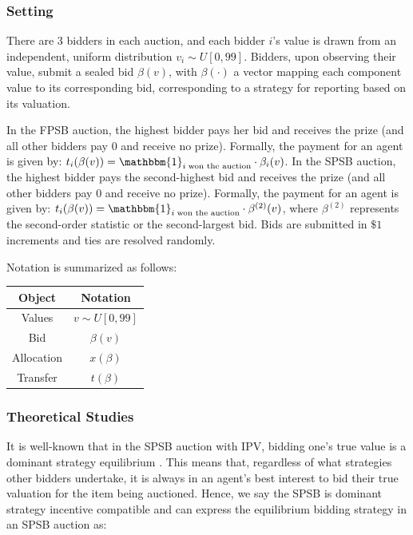 \documentclass{article} %
\begin{document}
\subsubsection{Setting}
There are $3$ bidders in each auction, and each bidder $i$'s value is drawn from an independent, uniform distribution $v_i \sim U[0, 99]$. Bidders, upon observing their value, submit a sealed bid $\beta(v)$, with $\beta(\cdot)$ a vector mapping each component value to its corresponding bid, corresponding to a strategy for reporting based on its valuation. 

In the FPSB auction, the highest bidder pays her bid and receives the prize (and all other bidders pay $0$ and receive no prize). Formally, the payment for an agent is given by: $t_i(\beta(v)) = \mathbbm{1}_{i \; \text{won the auction}}\cdot \beta_i(v)$. 
In the SPSB auction, the highest bidder pays the second-highest bid and receives the prize (and all other bidders pay $0$ and receive no prize). 
Formally, the payment for an agent is given by: $t_i(\beta(v)) = \mathbbm{1}_{i \; \text{won the auction}} \cdot \beta^{(2)}(v)$, where $\beta^{(2)}$ represents the second-order statistic or the second-largest bid. 
Bids are submitted in $\$1$ increments and ties are resolved randomly. 

Notation is summarized as follows:
\begin{table}[h]
    \centering
    \begin{tabular}{|c|c|}
        \hline
        Object & Notation \\
        \hline
        Values & $v \sim U[0,99]$ \\
        \hline
        Bid & $\beta(v)$ \\
        \hline
        Allocation & $x(\beta)$ \\
        \hline
        Transfer & $t(\beta)$ \\
        \hline
    \end{tabular}
    \label{tab:notation}
\end{table}
\subsubsection{Theoretical Studies}

It is well-known that in the SPSB auction with IPV, bidding one's true value is a dominant strategy equilibrium \cite{krishna2009auction}. 
This means that, regardless of what strategies other bidders undertake, it is always in an agent's best interest to bid their true valuation for the item being auctioned. Hence, we say the SPSB is dominant strategy incentive compatible and can express the equilibrium bidding strategy in an SPSB auction as:
\end{document}
